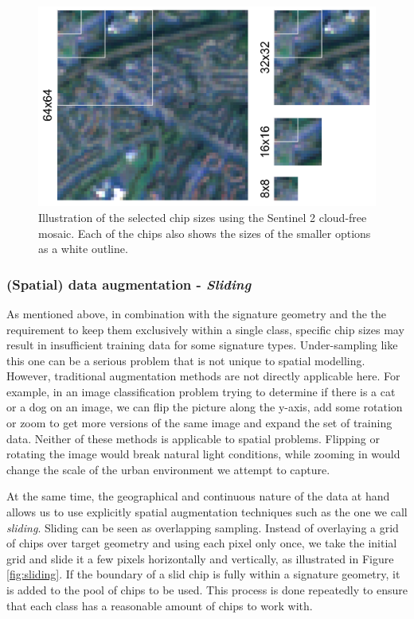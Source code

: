 \begin{figure}
    \centering
    \includegraphics[width=.8\linewidth]{fig/chips.png}
    \caption{Illustration of the selected chip sizes using the Sentinel 2 cloud-free mosaic. Each of the chips also shows the sizes of the smaller options as a white outline.}
    \label{fig:chips}
\end{figure}



\subsubsection{(Spatial) data augmentation - \textit{Sliding}}



As mentioned above, in combination with the signature
geometry and the
the requirement to keep them exclusively within a single class, specific chip sizes may result in
insufficient training data for some signature types. Under-sampling like this
one can be a serious problem that is not unique to spatial modelling. However,
traditional augmentation methods are not directly applicable here. For example, in an
image classification problem trying to determine if there is a cat or a dog on an image,
we can flip the picture along the y-axis, add some rotation or zoom to get more versions of
the same image and expand the set of training data. Neither of these methods is
applicable to spatial problems. Flipping or rotating the image would break
natural light conditions, while zooming in would change the scale of the urban environment
we attempt to capture.

At the same time, the geographical and continuous nature of the data at hand
allows us to use explicitly spatial augmentation techniques such as the one we
call \textit{sliding}.
Sliding can be seen as overlapping sampling. Instead of overlaying a grid of chips over
target geometry and using each pixel only once, we take the initial grid and slide it a
few pixels horizontally and vertically, as illustrated in Figure \ref{fig:sliding}. If
the boundary of a slid chip is fully within a signature geometry, it is added to the
pool of chips to be used. This process is done repeatedly to ensure that each class has
a reasonable amount of chips to work with.

